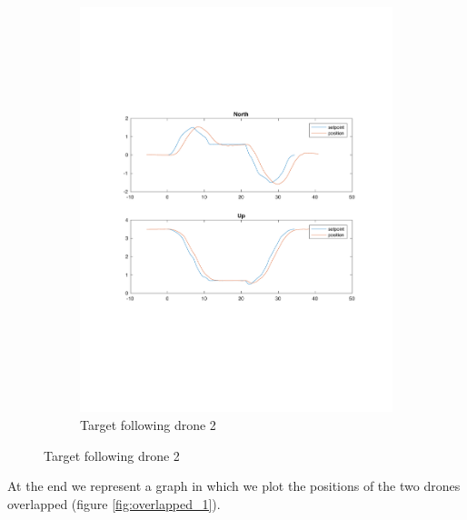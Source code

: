 \begin{figure}
\begin{subfigure}[b]{0.8\textwidth}
   \includegraphics[width=1\linewidth]{chapters/chapter-04/figures/following_2_1.pdf}
   \caption{Target following drone 2}
   \label{fig:following_2_1}
\end{subfigure}
\end{figure}

At the end we represent a graph in which we plot the positions of the two drones overlapped
(figure \ref{fig:overlapped_1}).

